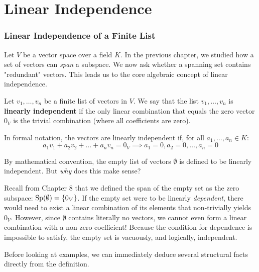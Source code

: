 \setcounter{chapter}{8}
\renewcommand{\thetheorem}{\thechapter.\arabic{theorem}}
\setcounter{theorem}{0}

\chapter{Linear Independence}

\subsection{Linear Independence of a Finite List}

Let $V$ be a vector space over a field $K$. In the previous chapter, we studied how a set of vectors can \textit{span} a subspace. We now ask whether a spanning set contains "redundant" vectors. This leads us to the core algebraic concept of linear independence.

\begin{definition}
Let $v_1, \dots, v_n$ be a finite list of vectors in $V$. We say that the list $v_1, \dots, v_n$ is \textbf{linearly independent} if the only linear combination that equals the zero vector $0_V$ is the trivial combination (where all coefficients are zero). 

In formal notation, the vectors are linearly independent if, for all $a_1, \dots, a_n \in K$:
\[
a_1 v_1 + a_2 v_2 + \dots + a_n v_n = 0_V \implies a_1 = 0, a_2 = 0, \dots, a_n = 0
\]
\end{definition}

\begin{remark}
By mathematical convention, the empty list of vectors $\emptyset$ is defined to be linearly independent. But \textit{why} does this make sense? 

Recall from Chapter 8 that we defined the span of the empty set as the zero subspace: $\operatorname{Sp}(\emptyset) = \{0_V\}$. If the empty set were to be linearly \textit{dependent}, there would need to exist a linear combination of its elements that non-trivially yields $0_V$. However, since $\emptyset$ contains literally no vectors, we cannot even form a linear combination with a non-zero coefficient! Because the condition for dependence is impossible to satisfy, the empty set is vacuously, and logically, independent.
\end{remark}

Before looking at examples, we can immediately deduce several structural facts directly from the definition.


